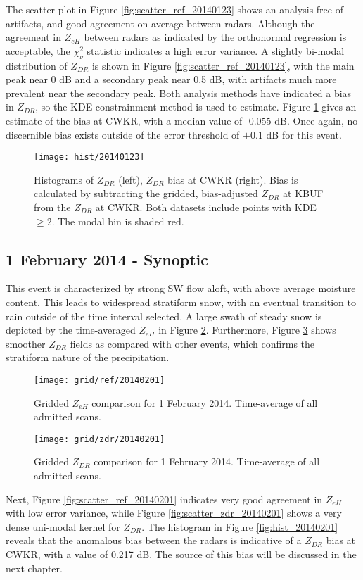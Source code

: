 The scatter-plot in Figure \ref{fig:scatter_ref_20140123} shows an analysis
free of artifacts, and good agreement on average between radars. Although the agreement in $Z_{eH}$ between
radars as indicated by the orthonormal regression is acceptable, the $\chi_\nu^{2}$
statistic indicates a high error variance. A slightly bi-modal distribution of $Z_{DR}$ is shown in 
Figure \ref{fig:scatter_ref_20140123}, with the main peak near 0 dB and a secondary peak near 0.5 dB, with
artifacts much more prevalent near the secondary
peak. Both analysis methods have indicated a bias in $Z_{DR}$, so the
KDE constrainment method is used to estimate. Figure \ref{fig:hist_20140123} gives an estimate of
the bias at CWKR, with a median value of -0.055 dB. Once again, no discernible bias exists outside of the error
threshold of $\pm$0.1 dB for this event.
\begin{figure}[H]
\texttt{[image: hist/20140123]}\centering
\caption{Histograms of $Z_{DR}$ (left), $Z_{DR}$ bias at CWKR (right). Bias is calculated by subtracting the gridded, bias-adjusted $Z_{DR}$ at KBUF from the
$Z_{DR}$ at CWKR. Both datasets include points with KDE $\geq 2$. The modal bin is shaded red. } 
\label{fig:hist_20140123}
\end{figure}

\subsection{1 February 2014 - Synoptic}
This event is characterized by strong SW flow aloft, with above average moisture content. This leads to
widespread stratiform snow, with an eventual transition to rain outside of the time interval selected.
A large swath of steady snow is depicted by the time-averaged $Z_{eH}$ in Figure \ref{fig:grid_ref_20140201}. 
Furthermore, Figure \ref{fig:grid_zdr_20140201} shows smoother $Z_{DR}$
fields as compared with other events, which confirms the stratiform nature of the precipitation. 
\begin{figure}[p]
\texttt{[image: grid/ref/20140201]}
\caption{Gridded $Z_{eH}$ comparison for 1 February 2014. Time-average of all admitted scans.} 
\label{fig:grid_ref_20140201}
\end{figure}
\begin{figure}[p]
\texttt{[image: grid/zdr/20140201]}
\caption{Gridded $Z_{DR}$ comparison for 1 February 2014. Time-average of all admitted scans.} 
\label{fig:grid_zdr_20140201}
\end{figure}
Next, Figure \ref{fig:scatter_ref_20140201} indicates very
good agreement in $Z_{eH}$ with low error variance, while Figure \ref{fig:scatter_zdr_20140201} shows a very dense uni-modal kernel for $Z_{DR}$. The
histogram in Figure \ref{fig:hist_20140201} reveals that the anomalous bias between the radars is indicative of a $Z_{DR}$ bias at CWKR, with a value of
0.217 dB. The source of this bias will be discussed in the next chapter.

